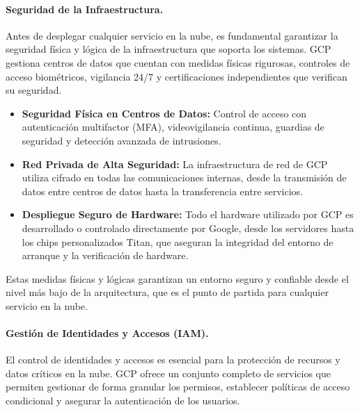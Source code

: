 {                \paragraph{Seguridad de la Infraestructura.}
                
                Antes de desplegar cualquier servicio en la nube, es fundamental garantizar la seguridad física y lógica de la infraestructura que soporta los sistemas. GCP gestiona centros de datos que cuentan con medidas físicas rigurosas, controles de acceso biométricos, vigilancia 24/7 y certificaciones independientes que verifican su seguridad.
            
                \begin{itemize}
                    \item \textbf{Seguridad Física en Centros de Datos:} Control de acceso con autenticación multifactor (MFA), videovigilancia continua, guardias de seguridad y detección avanzada de intrusiones.
                    \item \textbf{Red Privada de Alta Seguridad:} La infraestructura de red de GCP utiliza cifrado en todas las comunicaciones internas, desde la transmisión de datos entre centros de datos hasta la transferencia entre servicios.
                    \item \textbf{Despliegue Seguro de Hardware:} Todo el hardware utilizado por GCP es desarrollado o controlado directamente por Google, desde los servidores hasta los chips personalizados Titan, que aseguran la integridad del entorno de arranque y la verificación de hardware.
                \end{itemize}
            
                Estas medidas físicas y lógicas garantizan un entorno seguro y confiable desde el nivel más bajo de la arquitectura, que es el punto de partida para cualquier servicio en la nube.
            
                \paragraph{Gestión de Identidades y Accesos (IAM).}
                El control de identidades y accesos es esencial para la protección de recursos y datos críticos en la nube. GCP ofrece un conjunto completo de servicios que permiten gestionar de forma granular los permisos, establecer políticas de acceso condicional y asegurar la autenticación de los usuarios.
            
}
